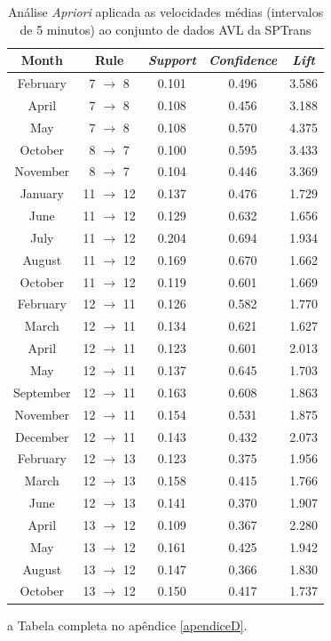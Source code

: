 \documentclass[
	12pt,				%
	oneside,			%
	a4paper,			%
	english,			%
	brazil				%
	]{abntex2ppgsi}
\begin{document}
\begin{table}[!htb]
\centering
\begin{threeparttable}
\caption {Análise \textit{Apriori} aplicada as velocidades médias (intervalos de 5 minutos) ao conjunto de dados AVL da SPTrans}
\label {tab:aprioriFull}
\begin{tabular}{c|c|c|c|c}
\hline
\textbf{Month} & \textbf{Rule} & \textit{\textbf{Support}} & \textit{\textbf{Confidence}} & \textit{\textbf{Lift}} \\
\hline
February & 7 $\rightarrow$ 8 & 0.101 & 0.496 & 3.586\\
April & 7 $\rightarrow$ 8  & 0.108 & 0.456 & 3.188\\
May & 7 $\rightarrow$ 8 & 0.108 & 0.570 & 4.375\\
\hline
\hline
October & 8 $\rightarrow$ 7 & 0.100 & 0.595 & 3.433\\
November & 8 $\rightarrow$ 7 & 0.104 & 0.446 & 3.369\\
\hline
\hline
January & 11 $\rightarrow$ 12 & 0.137 & 0.476 & 1.729 \\
June & 11 $\rightarrow$ 12 & 0.129 & 0.632 & 1.656\\
July & 11 $\rightarrow$ 12 & 0.204 & 0.694 & 1.934\\
August & 11 $\rightarrow$ 12 & 0.169 & 0.670 & 1.662\\
October & 11 $\rightarrow$ 12 & 0.119 & 0.601 & 1.669\\
\hline
\hline
February & 12 $\rightarrow$ 11 & 0.126 & 0.582 & 1.770\\
March & 12 $\rightarrow$ 11 & 0.134 & 0.621 & 1.627\\
April & 12 $\rightarrow$ 11 & 0.123 & 0.601 & 2.013\\
May & 12 $\rightarrow$ 11 & 0.137 & 0.645 & 1.703\\
September & 12 $\rightarrow$ 11 & 0.163 & 0.608 & 1.863\\
November & 12 $\rightarrow$ 11 & 0.154 & 0.531 & 1.875\\
December & 12 $\rightarrow$ 11 & 0.143 & 0.432 & 2.073\\
\hline
\hline
February & 12 $\rightarrow$ 13 & 0.123 & 0.375 & 1.956\\
March & 12 $\rightarrow$ 13 & 0.158 & 0.415 & 1.766\\
June & 12 $\rightarrow$ 13 & 0.141 & 0.370 & 1.907\\
\hline
\hline
April  & 13 $\rightarrow$ 12 & 0.109 & 0.367 & 2.280\\
May & 13 $\rightarrow$ 12 & 0.161 & 0.425 & 1.942\\
August & 13 $\rightarrow$ 12 & 0.147 & 0.366 & 1.830\\
October & 13 $\rightarrow$ 12 & 0.150 & 0.417 & 1.737\\
\hline
\end{tabular}
\begin{tablenotes}
            \item[a] Tabela completa no apêndice \ref{apendiceD}.
        \end{tablenotes}
\end{threeparttable}
\end{table}
\end{document}
